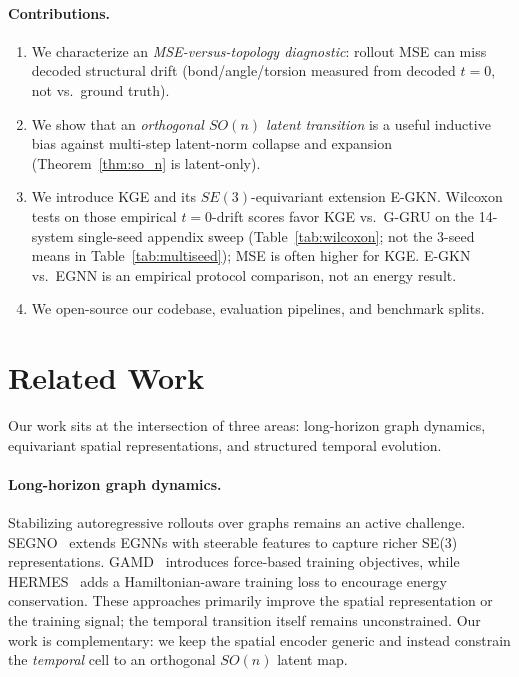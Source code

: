 \documentclass{article}
\newcommand{\GKE}{\textsc{KGE}}
\newcommand{\EGKN}{\textsc{E-GKN}}
\newcommand{\EGNN}{\textsc{EGNN}}
\newcommand{\GGRU}{\textsc{G-GRU}}
\begin{document}
\paragraph{Contributions.}
\begin{enumerate}
  \item We characterize an \emph{MSE-versus-topology diagnostic}: rollout MSE can miss decoded structural drift (bond/angle/torsion measured from decoded $t=0$, not vs.\ ground truth).
  \item We show that an \emph{orthogonal $SO(n)$ latent transition} is a useful inductive bias against multi-step latent-norm collapse and expansion (Theorem~\ref{thm:so_n} is latent-only).
  \item We introduce \GKE{} and its $SE(3)$-equivariant extension \EGKN{}. Wilcoxon tests on those empirical $t=0$-drift scores favor \GKE{} vs.\ \GGRU{} on the 14-system single-seed appendix sweep (Table~\ref{tab:wilcoxon}; not the 3-seed means in Table~\ref{tab:multiseed}); MSE is often higher for \GKE{}. \EGKN{} vs.\ \EGNN{} is an empirical protocol comparison, not an energy result.
  \item We open-source our codebase, evaluation pipelines, and benchmark splits.
\end{enumerate}

\section{Related Work}
\label{sec:related}

Our work sits at the intersection of three areas: long-horizon graph dynamics, equivariant spatial representations, and structured temporal evolution.

\paragraph{Long-horizon graph dynamics.}
Stabilizing autoregressive rollouts over graphs remains an active challenge.  SEGNO~\citep{liu2023segno} extends EGNNs with steerable features to capture richer SE(3) representations.  GAMD~\citep{wang2023gamd} introduces force-based training objectives, while HERMES~\citep{fu2023simulate} adds a Hamiltonian-aware training loss to encourage energy conservation.  These approaches primarily improve the spatial representation or the training signal; the temporal transition itself remains unconstrained.  Our work is complementary: we keep the spatial encoder generic and instead constrain the \emph{temporal} cell to an orthogonal $SO(n)$ latent map.
\end{document}
